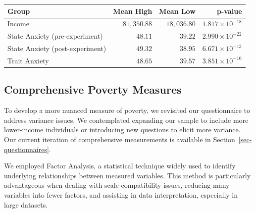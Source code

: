 \documentclass[
]{report}
\begin{document}
\begin{table}

\caption{\label{tbl-exp1-demo}Descriptive statistics for income and
anxiety scores}\begin{minipage}[t]{\linewidth}

{\centering 

\begin{longtable}{lrrr}
\tabularnewline

\toprule
Group & Mean High & Mean Low & p-value \\ 
\midrule
Income & $81,350.88$ & $18,036.80$ & $1.817 \times 10^{-18}$ \\ 
State Anxiety (pre-experiment) & $48.11$ & $39.22$ & $2.990 \times 10^{-22}$ \\ 
State Anxiety (post-experiment) & $49.32$ & $38.95$ & $6.671 \times 10^{-13}$ \\ 
Trait Anxiety & $48.65$ & $39.57$ & $3.851 \times 10^{-10}$ \\ 
\bottomrule
\end{longtable}

}

\end{minipage}%

\end{table}

\hypertarget{comprehensive-poverty-measures}{%
\subsection{Comprehensive Poverty
Measures}\label{comprehensive-poverty-measures}}

To develop a more nuanced measure of poverty, we revisited our
questionnaire to address variance issues. We contemplated expanding our
sample to include more lower-income individuals or introducing new
questions to elicit more variance. Our current iteration of
comprehensive measurements is available in
Section~\ref{sec-questionnaires}.

We employed Factor Analysis, a statistical technique widely used to
identify underlying relationships between measured variables. This
method is particularly advantageous when dealing with scale
compatibility issues, reducing many variables into fewer factors, and
assisting in data interpretation, especially in large datasets.
\end{document}
